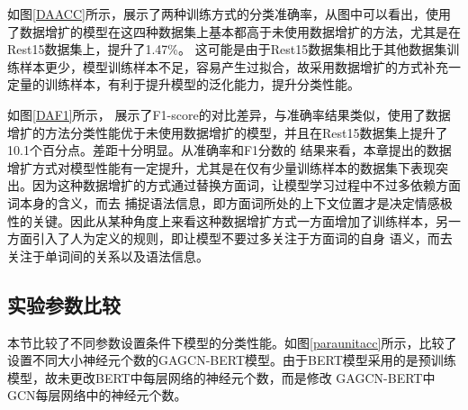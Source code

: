 

如图\ref{DAACC}所示，展示了两种训练方式的分类准确率，从图中可以看出，使用了数据增扩的模型在这四种数据集上基本都高于未使用数据增扩的方法，尤其是在Rest15数据集上，提升了1.47\%。
这可能是由于Rest15数据集相比于其他数据集训练样本更少，模型训练样本不足，容易产生过拟合，故采用数据增扩的方式补充一定量的训练样本，有利于提升模型的泛化能力，提升分类性能。

如图\ref{DAF1}所示，
展示了F1-score的对比差异，与准确率结果类似，使用了数据增扩的方法分类性能优于未使用数据增扩的模型，并且在Rest15数据集上提升了10.1个百分点。差距十分明显。从准确率和F1分数的
结果来看，本章提出的数据增扩方式对模型性能有一定提升，尤其是在仅有少量训练样本的数据集下表现突出。因为这种数据增扩的方式通过替换方面词，让模型学习过程中不过多依赖方面词本身的含义，而去
捕捉语法信息，即方面词所处的上下文位置才是决定情感极性的关键。因此从某种角度上来看这种数据增扩方式一方面增加了训练样本，另一方面引入了人为定义的规则，即让模型不要过多关注于方面词的自身
语义，而去关注于单词间的关系以及语法信息。

\subsection{实验参数比较}
本节比较了不同参数设置条件下模型的分类性能。如图\ref{paraunitacc}所示，比较了设置不同大小神经元个数的GAGCN-BERT模型。由于BERT模型采用的是预训练模型，故未更改BERT中每层网络的神经元个数，而是修改
GAGCN-BERT中GCN每层网络中的神经元个数。

